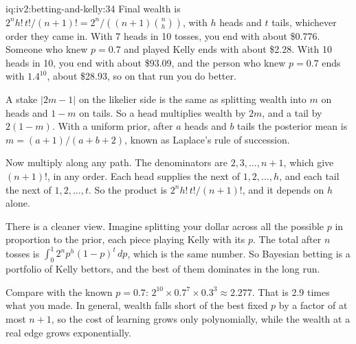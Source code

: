 \begin{solution}{iq:iv2:betting-and-kelly:34}
Final wealth is $2^n h!\,t!/(n + 1)! = 2^n/\left((n + 1)\binom{n}{h}\right)$, with $h$ heads and $t$ tails, whichever order they came in. With 7 heads in 10 tosses, you end with about \$0.776. Someone who knew $p = 0.7$ and played Kelly ends with about \$2.28. With 10 heads in 10, you end with about \$93.09, and the person who knew $p = 0.7$ ends with $1.4^{10}$, about \$28.93, so on that run you do better.

A stake $|2m - 1|$ on the likelier side is the same as splitting wealth into $m$ on heads and $1 - m$ on tails. So a head multiplies wealth by $2m$, and a tail by $2(1 - m)$. With a uniform prior, after $a$ heads and $b$ tails the posterior mean is $m = (a + 1)/(a + b + 2)$, known as Laplace's rule of succession.

Now multiply along any path. The denominators are $2, 3, \ldots, n + 1$, which give $(n + 1)!$, in any order. Each head supplies the next of $1, 2, \ldots, h$, and each tail the next of $1, 2, \ldots, t$. So the product is $2^n h!\,t!/(n + 1)!$, and it depends on $h$ alone.

There is a cleaner view. Imagine splitting your dollar across all the possible $p$ in proportion to the prior, each piece playing Kelly with its $p$. The total after $n$ tosses is $\int_0^1 2^n p^h(1 - p)^t\,dp$, which is the same number. So Bayesian betting is a portfolio of Kelly bettors, and the best of them dominates in the long run.

Compare with the known $p = 0.7$: $2^{10} \times 0.7^7 \times 0.3^3 \approx 2.277$. That is 2.9 times what you made. In general, wealth falls short of the best fixed $p$ by a factor of at most $n + 1$, so the cost of learning grows only polynomially, while the wealth at a real edge grows exponentially.

\end{solution}


